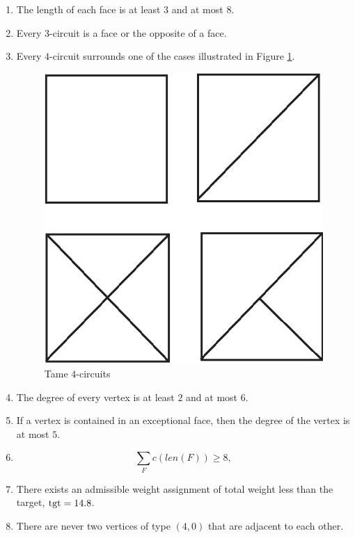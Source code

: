 \begin{enumerate}
    \label{definition:tame}
    \item The length of each face is at least $3$ and at most $8$.
    \label{definition:tame:length}

    \item Every $3$-circuit is a face or the opposite of a face.
    \label{definition:tame:3-circuit}

    \item Every $4$-circuit surrounds one of the cases illustrated in Figure
    \ref{fig:fourcircuit}.
    \label{definition:tame:4-circuit}
    \begin{figure}[htb]
        \centering
        \includegraphics{PS/tame4circuit.eps}
        \caption{Tame $4$-circuits}
        \label{fig:fourcircuit}
    \end{figure}

    \item The degree of every vertex is at least $2$ and at most
    $6$.
    \label{definition:tame:degree}

    \item If a vertex is contained in an exceptional face,
        then the degree of the vertex is at most $5$.
    \label{definition:tame:degreeE}

    \item $$\sum_F c(len(F)) \ge 8,$$
    \label{definition:tame:score}


    \item There exists an admissible weight assignment
        of total weight less than the target, ${\operatorname{tgt}}=14.8$.
    \label{definition:tame:squander}

    \item There are never two vertices of type $(4,0)$ that are
    adjacent to each other.
    \label{definition:tame:40}

\end{enumerate}
